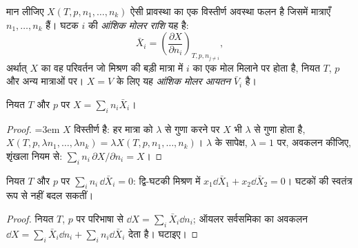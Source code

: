 \begin{definition}[आंशिक मोलर राशि]\label{def:b2:chemical-potential:partial-molar}
मान लीजिए $X(T, p, n_1, \dots, n_k)$ ऐसी प्रावस्था का एक विस्तीर्ण अवस्था फलन है
जिसमें मात्राएँ $n_1, \dots, n_k$ हैं। घटक $i$ की \emph{आंशिक मोलर
राशि} यह है:
\[
  \bar X_i = \left(\frac{\partial X}{\partial n_i}\right)_{T, p, n_{j \ne i}} ,
\]
अर्थात् $X$ का वह परिवर्तन जो मिश्रण की बड़ी मात्रा में $i$ का एक मोल मिलाने पर होता है,
नियत $T$, $p$ और अन्य मात्राओं पर। $X = V$ के लिए यह \emph{आंशिक
मोलर आयतन} $\bar V_i$ है।
\end{definition}

\begin{theorem}\label{thm:b2:chemical-potential:euler}
नियत $T$ और $p$ पर $X = \sum_i n_i\bar X_i$।
\end{theorem}

\begin{proof}\emergencystretch=3em
$X$ विस्तीर्ण है: हर मात्रा को $\lambda$ से गुणा करने पर $X$ भी
$\lambda$ से गुणा होता है, $X(T, p, \lambda n_1, \dots, \lambda n_k) = \lambda X(T, p, n_1,
\dots, n_k)$। $\lambda$ के सापेक्ष, $\lambda = 1$ पर, अवकलन कीजिए,
शृंखला नियम से: $\sum_i n_i\,\partial X/\partial n_i = X$।
\end{proof}

\begin{proposition}[गिब्स--ड्यूहेम संबंध]\label{prop:b2:chemical-potential:gibbs-duhem}
नियत $T$ और $p$ पर $\sum_i n_i\,\dd\bar X_i = 0$: द्वि-घटकी मिश्रण में
$x_1\dd\bar X_1 + x_2\dd\bar X_2 = 0$। घटकों की 
स्वतंत्र रूप से नहीं बदल सकतीं।
\end{proposition}

\begin{proof}
नियत $T$, $p$ पर परिभाषा से $\dd X = \sum_i\bar X_i\dd n_i$; ऑयलर
सर्वसमिका का अवकलन $\dd X = \sum_i\bar X_i\dd n_i + \sum_i
n_i\dd\bar X_i$ देता है। घटाइए।
\end{proof}

